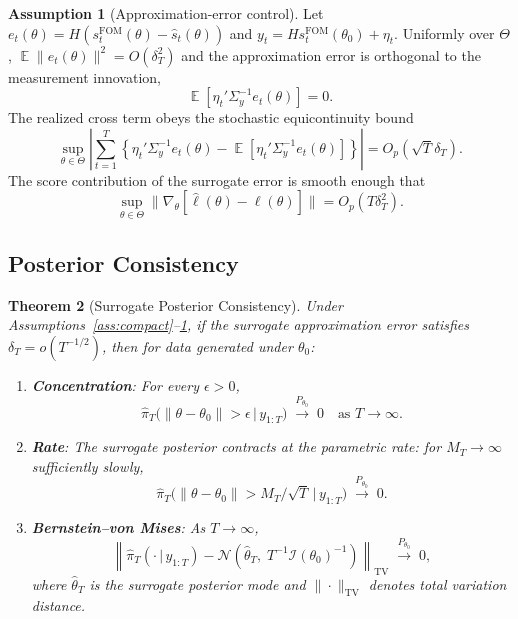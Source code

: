 \documentclass[12pt]{article}
\theoremstyle{plain}
\newtheorem{theorem}{Theorem}[section]
\theoremstyle{definition}
\newtheorem{assumption}[theorem]{Assumption}
\theoremstyle{remark}
\DeclareMathOperator{\E}{\mathbb{E}}
\newcommand{\given}{\,|\,}
\newcommand{\Sigmay}{\Sigma_y}
\begin{document}
\begin{assumption}[Approximation-error control]
\label{ass:surrogate_smoothness}
Let $e_t(\theta) = H(s_t^{\text{FOM}}(\theta)-\hat{s}_t(\theta))$ and $y_t = Hs_t^{\text{FOM}}(\theta_0)+\eta_t$. Uniformly over $\Theta$, $\E\|e_t(\theta)\|^2 = O(\delta_T^2)$ and the approximation error is orthogonal to the measurement innovation,
\[
\E[\eta_t'\Sigmay^{-1}e_t(\theta)] = 0.
\]
The realized cross term obeys the stochastic equicontinuity bound
\[
\sup_{\theta\in\Theta}
\left|\sum_{t=1}^T
\left\{\eta_t'\Sigmay^{-1}e_t(\theta)
- \E[\eta_t'\Sigmay^{-1}e_t(\theta)]\right\}\right|
= O_p(\sqrt{T}\delta_T).
\]
The score contribution of the surrogate error is smooth enough that
\[
\sup_{\theta\in\Theta}\|\nabla_\theta[\hat{\ell}(\theta)-\ell(\theta)]\|
= O_p(T\delta_T^2).
\]
\end{assumption}

\subsection{Posterior Consistency}

\begin{theorem}[Surrogate Posterior Consistency]
\label{thm:posterior_consistency}
Under Assumptions~\ref{ass:compact}--\ref{ass:surrogate_smoothness}, if the surrogate approximation error satisfies $\delta_T = o(T^{-1/2})$, then for data generated under $\theta_0$:
\begin{enumerate}[label=(\roman*)]
\item \textbf{Concentration}: For every $\epsilon > 0$,
\[
\hat{\pi}_T\!\bigl(\|\theta - \theta_0\| > \epsilon \given y_{1:T}\bigr)
  \;\xrightarrow{P_{\theta_0}}\; 0
  \quad \text{as } T \to \infty.
\]
\item \textbf{Rate}: The surrogate posterior contracts at the parametric rate: for $M_T \to \infty$ sufficiently slowly,
\[
\hat{\pi}_T\!\bigl(\|\theta - \theta_0\| > M_T / \sqrt{T} \given
  y_{1:T}\bigr) \;\xrightarrow{P_{\theta_0}}\; 0.
\]
\item \textbf{Bernstein--von Mises}: As $T \to \infty$,
\[
\left\| \hat{\pi}_T(\cdot \given y_{1:T}) -
  \mathcal{N}\!\left(\hat{\theta}_T,\;
    T^{-1}\mathcal{I}(\theta_0)^{-1}\right) \right\|_{\text{TV}}
  \;\xrightarrow{P_{\theta_0}}\; 0,
\]
where $\hat{\theta}_T$ is the surrogate posterior mode and $\|\cdot\|_{\text{TV}}$ denotes total variation distance.
\end{enumerate}
\end{theorem}
\end{document}
